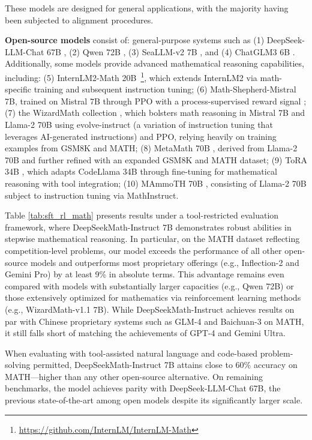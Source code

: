 These models are designed for general applications, with the majority having been subjected to alignment procedures.

\item \textbf{Open-source models} consist of: general-purpose systems such as (1) DeepSeek-LLM-Chat 67B \citep{deepseek-llm}, (2) Qwen 72B \citep{qwen}, (3) SeaLLM-v2 7B \citep{seallm}, and (4) ChatGLM3 6B \citep{chatglm3}. Additionally, some models provide advanced mathematical reasoning capabilities, including: (5) InternLM2-Math 20B~\footnote{\url{https://github.com/InternLM/InternLM-Math}}, which extends InternLM2 via math-specific training and subsequent instruction tuning; (6) Math-Shepherd-Mistral 7B, trained on Mistral 7B \citep{mistral} through PPO with a process-supervised reward signal \citep{schulman2017proximal}; (7) the WizardMath collection \citep{wizardmath}, which bolsters math reasoning in Mistral 7B and Llama-2 70B \citep{llama2} using evolve-instruct (a variation of instruction tuning that leverages AI-generated instructions) and PPO, relying heavily on training examples from GSM8K and MATH; (8) MetaMath 70B \citep{metamath}, derived from Llama-2 70B and further refined with an expanded GSM8K and MATH dataset; (9) ToRA 34B \cite{tora}, which adapts CodeLlama 34B through fine-tuning for mathematical reasoning with tool integration; (10) MAmmoTH 70B \citep{MathInstruct}, consisting of Llama-2 70B subject to instruction tuning via MathInstruct.

Table \ref{tab:sft_rl_math} presents results under a tool-restricted evaluation framework, where DeepSeekMath-Instruct 7B demonstrates robust abilities in stepwise mathematical reasoning. In particular, on the MATH dataset reflecting competition-level problems, our model exceeds the performance of all other open-source models and outperforms most proprietary offerings (e.g., Inflection-2 and Gemini Pro) by at least 9\% in absolute terms. This advantage remains even compared with models with substantially larger capacities (e.g., Qwen 72B) or those extensively optimized for mathematics via reinforcement learning methods (e.g., WizardMath-v1.1 7B). While DeepSeekMath-Instruct achieves results on par with Chinese proprietary systems such as GLM-4 and Baichuan-3 on MATH, it still falls short of matching the achievements of GPT-4 and Gemini Ultra.

When evaluating with tool-assisted natural language and code-based problem-solving permitted, DeepSeekMath-Instruct 7B attains close to 60\% accuracy on MATH—higher than any other open-source alternative. On remaining benchmarks, the model achieves parity with DeepSeek-LLM-Chat 67B, the previous state-of-the-art among open models despite its significantly larger scale.

